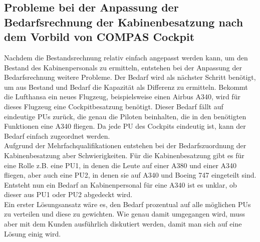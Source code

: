 \documentclass [12pt, a4paper, oneside, titlepage, ngerman]{article}
\begin{document}
\subsection{Probleme bei der Anpassung der Bedarfsrechnung der Kabinenbesatzung nach dem Vorbild von COMPAS Cockpit}
Nachdem die Bestandsrechnung relativ einfach angepasst werden kann, um den Bestand des Kabinenpersonals zu ermitteln, entstehen bei der Anpassung der Bedarfsrechnung weitere Probleme. Der Bedarf wird als nächster Schritt benötigt, um aus Bestand und Bedarf die Kapazität als Differenz zu ermitteln. Bekommt die Lufthansa ein neues Flugzeug, beispielsweise einen Airbus A340, wird für dieses Flugzeug eine Cockpitbesatzung benötigt. Dieser Bedarf fällt auf eindeutige \acp{PU} zurück, die genau die Piloten beinhalten, die in den benötigten Funktionen eine A340 fliegen. Da jede \ac{PU} des Cockpits eindeutig ist, kann der Bedarf einfach zugeordnet werden. \\
Aufgrund der Mehrfachqualifikationen entstehen bei der Bedarfszuordnung der Kabinenbesatzung aber Schwierigkeiten. Für die Kabinenbesatzung gibt es für eine Rolle z.B. eine \ac{PU}1, in denen die Leute auf einer A380 und einer A340 fliegen, aber auch eine \ac{PU}2, in denen sie auf A340 und Boeing 747 eingeteilt sind. Entsteht nun ein Bedarf an Kabinenpersonal für eine A340 ist es unklar, ob dieser aus \ac{PU}1 oder \ac{PU}2 abgedeckt wird. \\
Ein erster Lösungsansatz wäre es, den Bedarf prozentual auf alle möglichen \acp{PU} zu verteilen und diese zu gewichten. Wie genau damit umgegangen wird, muss aber mit dem Kunden ausführlich diskutiert werden, damit man sich auf eine Lösung einig wird.
\end{document}
